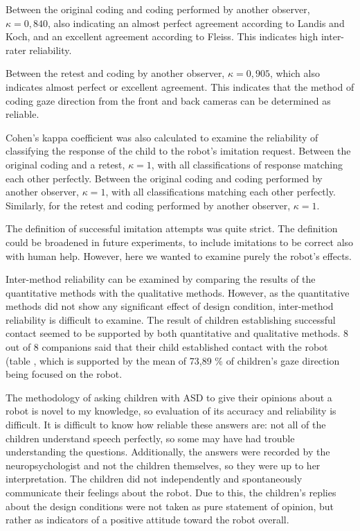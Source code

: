 Between the original coding and coding performed by another observer, $\kappa = 0,840$, also indicating an almost perfect agreement according to Landis and Koch, and an excellent agreement according to Fleiss. This indicates high inter-rater reliability.

Between the retest and coding by another observer, $\kappa = 0,905$, which also indicates almost perfect or excellent agreement. This indicates that the method of coding gaze direction from the front and back cameras can be determined as reliable.

Cohen's kappa coefficient was also calculated to examine the reliability of classifying the response of the child to the robot's imitation request. Between the original coding and a retest, $\kappa = 1$, with all classifications of response matching each other perfectly. Between the original coding and coding performed by another observer,  $\kappa = 1$, with all classifications matching each other perfectly. Similarly, for the retest and coding performed by another observer, $\kappa = 1$.

The definition of successful imitation attempts was quite strict. The definition could be broadened in future experiments, to include imitations to be correct also with human help. However, here we wanted to examine purely the robot's effects. 

Inter-method reliability can be examined by comparing the results of the quantitative methods with the qualitative methods. However, as the quantitative methods did not show any significant effect of design condition, inter-method reliability is difficult to examine. The result of children establishing successful contact seemed to be supported by both quantitative and qualitative methods. 8 out of 8 companions said that their child established contact with the robot (table \label{table:contact}, which is supported by the  mean of 73,89 \% of children's gaze direction being focused on the robot.

The methodology of asking children with ASD to give their opinions about a robot is novel to my knowledge, so evaluation of its accuracy and reliability is difficult. It is difficult to know how reliable these answers are: not all of the children understand speech perfectly, so some may have had trouble understanding the questions. Additionally, the answers were recorded by the neuropsychologist and not the children themselves, so they were up to her interpretation. The children did not independently and spontaneously communicate their feelings about the robot. Due to this, the children's replies about the design conditions were not taken as pure statement of opinion, but rather as indicators of a positive attitude toward the robot overall.

